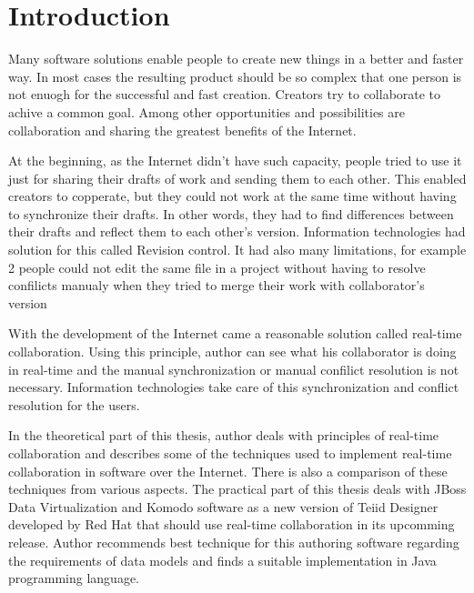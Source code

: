 \documentclass[12pt,oneside,draft]{fithesis2}
\begin{document}
\FrontMatter
\ThesisTitlePage
\begin{ThesisDeclaration}
\DeclarationText
\AdvisorName
\end{ThesisDeclaration}
\begin{ThesisThanks}
\end{ThesisThanks}
\begin{ThesisAbstract}
\end{ThesisAbstract}
\begin{ThesisKeyWords}
\end{ThesisKeyWords}
\tableofcontents 
\MainMatter
\chapter{Introduction} 
Many software solutions enable people to create new things in a better and faster way. In most cases the resulting product should be so complex that one person is not enuogh for the successful and fast creation. Creators try to collaborate to achive a common goal. Among other opportunities and possibilities are collaboration and sharing the greatest benefits of the Internet. \par
At the beginning, as the Internet didn't have such capacity, people tried to use it just for sharing their drafts of work and sending them to each other. This enabled creators to copperate, but they could not work at the same time without having to synchronize their drafts. In other words, they had to find differences between their drafts and reflect them to each other's version. Information technologies had solution for this called Revision control. It had also many limitations, for example 2 people could not edit the same file in a project without having to resolve confilicts manualy when they tried to merge their work with collaborator's version\par
With the development of the Internet came a reasonable solution called real-time collaboration. Using this principle, author can see what his collaborator is doing in real-time and the manual synchronization or manual confilict resolution is not necessary. Information technologies take care of this synchronization and conflict resolution for the users.\par
In the theoretical part of this thesis, author deals with principles of real-time collaboration and describes some of the techniques used to implement real-time collaboration in software over the Internet. There is also a comparison of these techniques from various aspects. The practical part of this thesis deals with JBoss Data Virtualization and Komodo software as a new version of Teiid Designer developed by Red Hat that should use real-time collaboration in its upcomming release. Author recommends best technique for this authoring software regarding the requirements of data models and finds a suitable implementation in Java programming language.
\end{document}

